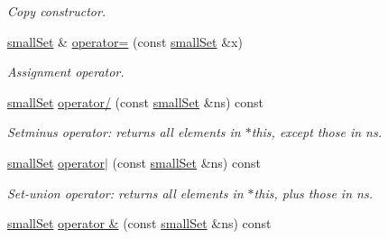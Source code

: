 \begin{CompactItemize}
\begin{CompactList}\small\item\em Copy constructor. \item\end{CompactList}\item 
\hypertarget{classdai_1_1smallSet_5cbc0482938044c4ee917844f3ed5842}{
\hyperlink{classdai_1_1smallSet}{smallSet} \& \hyperlink{classdai_1_1smallSet_5cbc0482938044c4ee917844f3ed5842}{operator=} (const \hyperlink{classdai_1_1smallSet}{smallSet} \&x)}
\label{classdai_1_1smallSet_5cbc0482938044c4ee917844f3ed5842}

\begin{CompactList}\small\item\em Assignment operator. \item\end{CompactList}\item 
\hypertarget{classdai_1_1smallSet_daa0dd9b812a6254226965227c0d4828}{
\hyperlink{classdai_1_1smallSet}{smallSet} \hyperlink{classdai_1_1smallSet_daa0dd9b812a6254226965227c0d4828}{operator/} (const \hyperlink{classdai_1_1smallSet}{smallSet} \&ns) const }
\label{classdai_1_1smallSet_daa0dd9b812a6254226965227c0d4828}

\begin{CompactList}\small\item\em Setminus operator: returns all elements in $\ast$this, except those in ns. \item\end{CompactList}\item 
\hypertarget{classdai_1_1smallSet_00de21ede4f1c3d4ba8c3628d67e6446}{
\hyperlink{classdai_1_1smallSet}{smallSet} \hyperlink{classdai_1_1smallSet_00de21ede4f1c3d4ba8c3628d67e6446}{operator$|$} (const \hyperlink{classdai_1_1smallSet}{smallSet} \&ns) const }
\label{classdai_1_1smallSet_00de21ede4f1c3d4ba8c3628d67e6446}

\begin{CompactList}\small\item\em Set-union operator: returns all elements in $\ast$this, plus those in ns. \item\end{CompactList}\item 
\hypertarget{classdai_1_1smallSet_6f436313486360d66a5b9e2ea1a861bd}{
\hyperlink{classdai_1_1smallSet}{smallSet} \hyperlink{classdai_1_1smallSet_6f436313486360d66a5b9e2ea1a861bd}{operator \&} (const \hyperlink{classdai_1_1smallSet}{smallSet} \&ns) const }
\label{classdai_1_1smallSet_6f436313486360d66a5b9e2ea1a861bd}


\end{CompactItemize}
